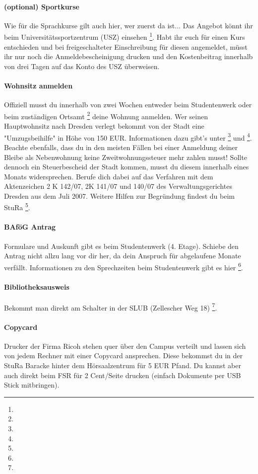 \paragraph{(optional) Sportkurse}
Wie für die Sprachkurse gilt auch hier, wer zuerst da ist...
Das Angebot könnt ihr beim Universitätssportzentrum (USZ) einsehen \footnote{}.
Habt ihr euch für einen Kurs entschieden und bei freigeschalteter Einschreibung für diesen angemeldet, müsst ihr nur noch die Anmeldebescheinigung drucken und den Kostenbeitrag innerhalb von drei Tagen auf das Konto des USZ überweisen.


\paragraph{Wohnsitz anmelden}
Offiziell musst du innerhalb von zwei Wochen entweder beim Studentenwerk oder beim zuständigen Ortsamt \footnote{} deine Wohnung anmelden.
Wer seinen Hauptwohnsitz nach Dresden verlegt bekommt von der Stadt eine "Umzugsbeihilfe" in Höhe von 150 EUR.
Informationen dazu gibt's unter \footnote{} und \footnote{}.
Beachte ebenfalls, dass du in den meisten Fällen bei einer Anmeldung deiner Bleibe als Nebenwohnung keine Zweitwohnungssteuer mehr zahlen musst!
Sollte dennoch ein Steuerbescheid der Stadt kommen, musst du diesem innerhalb eines Monats widersprechen.
Berufe dich dabei auf das Verfahren mit dem Aktenzeichen 2 K 142/07, 2K 141/07 und 140/07 des Verwaltungsgerichtes Dresden aus dem Juli 2007.
Weitere Hilfen zur Begründung findest du beim StuRa \footnote{}.

\paragraph{BAföG Antrag}
Formulare und Auskunft gibt es beim Studentenwerk (4. Etage).
Schiebe den Antrag nicht allzu lang vor dir her, da dein Anspruch für abgelaufene Monate verfällt.
Informationen zu den Sprechzeiten beim Studentenwerk gibt es hier \footnote{}.

\paragraph{Bibliotheksausweis}
Bekommt man direkt am Schalter in der SLUB (Zellescher Weg 18) \footnote{}.


\paragraph{Copycard}
Drucker der Firma Ricoh stehen quer über den Campus verteilt und lassen sich von jedem Rechner mit einer Copycard ansprechen.
Diese bekommst du in der StuRa Baracke hinter dem Hörsaalzentrum für 5 EUR Pfand. Du kannst aber auch direkt beim FSR für 2 Cent/Seite drucken (einfach Dokumente per USB Stick mitbringen).

